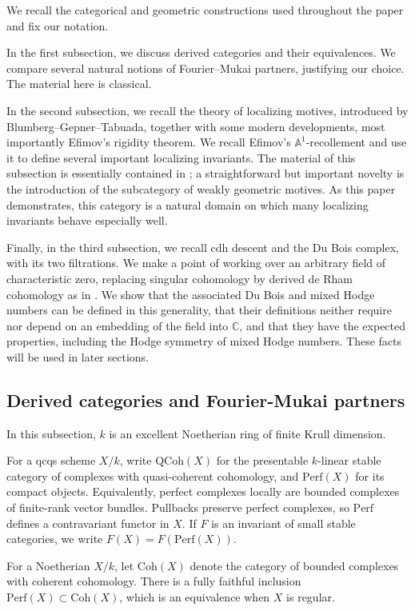 \documentclass{amsart}
\theoremstyle{plain}
\theoremstyle{definition}
\newcommand{\bbA}{\mathbb{A}}
\newcommand{\bbC}{\mathbb{C}}
\newcommand{\Perf}{\mathrm{Perf}}
\newcommand{\Coh}{\mathrm{Coh}}
\newcommand{\QCoh}{\mathrm{QCoh}}
\begin{document}
We recall the categorical and geometric constructions used throughout the paper and fix our notation.

In the first subsection, we discuss derived categories and their equivalences. We compare several natural notions of Fourier--Mukai partners, justifying our choice. The material here is classical.

In the second subsection, we recall the theory of localizing motives, introduced by Blumberg--Gepner--Tabuada, together with some modern developments, most importantly Efimov's rigidity theorem. We recall Efimov's $\bbA^1$-recollement and use it to define several important localizing invariants. The material of this subsection is essentially contained in \cite{Efi25b}; a straightforward but important novelty is the introduction of the subcategory of weakly geometric motives.
As this paper demonstrates, this category is a natural domain on which many localizing invariants behave especially well.

Finally, in the third subsection, we recall cdh descent and the Du Bois complex, with its two filtrations. We make a point of working over an arbitrary field of characteristic zero, replacing singular cohomology by derived de Rham cohomology as in \cite{Bha12}. We show that the associated Du Bois and mixed Hodge numbers can be defined in this generality, that their definitions neither require nor depend on an embedding of the field into $\bbC$, and that they have the expected properties, including the Hodge symmetry of mixed Hodge numbers. These facts will be used in later sections.

\subsection{Derived categories and Fourier-Mukai partners}\label{derivedcategories}

In this subsection, $k$ is an excellent Noetherian ring of finite Krull dimension.

For a qcqs scheme $X/k$, write $\QCoh(X)$ for the presentable $k$-linear stable category of complexes with quasi-coherent cohomology, and
$\Perf(X)$ for its compact objects. Equivalently, perfect complexes locally are bounded complexes of finite-rank vector bundles. Pullbacks preserve perfect complexes, so $\Perf$ defines a contravariant functor in $X$. If $F$ is an invariant of small stable categories, we write
$F(X)=F(\Perf(X))$.

For a Noetherian $X/k$, let $\Coh(X)$ denote the category of bounded complexes with coherent cohomology. There is a fully faithful inclusion $\Perf(X)\subset\Coh(X)$, which is an equivalence when $X$ is regular.
\end{document}
